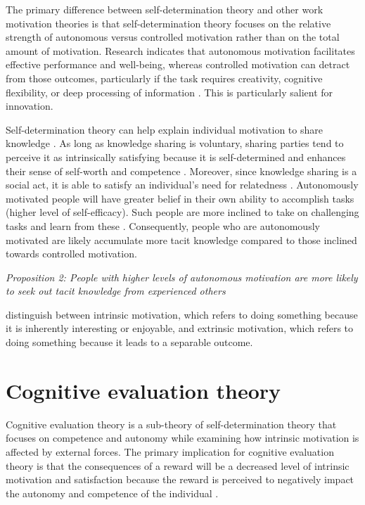 The primary difference between self-determination theory and other work motivation theories is that self-determination theory focuses on the relative strength of autonomous versus controlled motivation rather than on the total amount of motivation. Research indicates that autonomous motivation facilitates effective performance and well-being, whereas controlled motivation can detract from those outcomes, particularly if the task requires creativity, cognitive flexibility, or deep processing of information \citep{gagne2005self}. This is particularly salient for innovation. \medskip

Self-determination theory can help explain individual motivation to share knowledge \citep{gagne2009model}. As long as knowledge sharing is voluntary, sharing parties tend to perceive it as intrinsically satisfying because it is self-determined and enhances their sense of self-worth and competence \citep{kaser2001knowledge,lam2010knowledge,dumbach2014establishing}. Moreover, since knowledge sharing is a social act, it is able to satisfy an individual's need for relatedness \citep{llopis2016understanding}. Autonomously motivated people will have greater belief in their own ability to accomplish tasks (higher level of self-efficacy). Such people are more inclined to take on challenging tasks and learn from these \citep{bandura1977self}. Consequently, people who are autonomously motivated are likely accumulate more tacit knowledge compared to those inclined towards controlled motivation. \medskip

\emph{Proposition 2: People with higher levels of autonomous motivation are more likely to seek out tacit knowledge from experienced others}


\citet{deci1985general} distinguish between intrinsic motivation, which refers to doing something because it is inherently interesting or enjoyable, and extrinsic motivation, which refers to doing something because it leads to a separable outcome. 

\section{Cognitive evaluation theory}

Cognitive evaluation theory is a sub-theory of self-determination theory that focuses on competence and autonomy while examining how intrinsic motivation is affected by external forces. The primary implication for cognitive evaluation theory is that the consequences of a reward will be a decreased level of intrinsic motivation and satisfaction because the reward is perceived to negatively impact the autonomy and competence of the individual \citep{deci1999meta}. 

